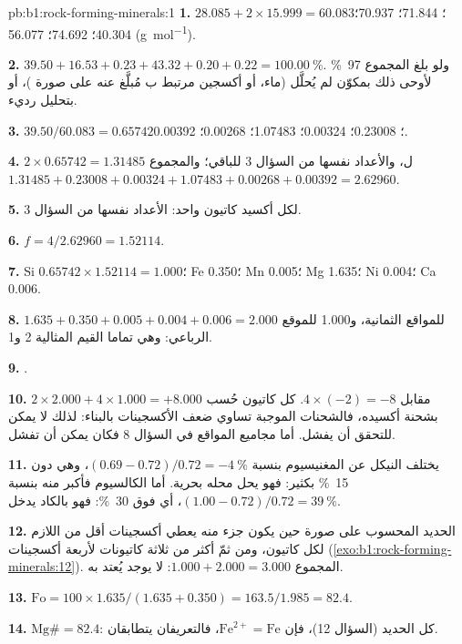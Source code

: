 \begin{solution}{pb:b1:rock-forming-minerals:1}
\textbf{1.}  $28.085 + 2\times15.999 = 60.083$؛  71.844؛
 70.937؛  40.304؛  74.692؛  56.077
(\si{g.mol^{-1}}).

\textbf{2.} $39.50 + 16.53 + 0.23 + 43.32 + 0.20 + 0.22 =
\qty{100.00}{\percent}$. ولو بلغ المجموع \qty{97}{\percent} لأوحى ذلك بمكوّن لم يُحلَّل (ماء، أو أكسجين مرتبط ب مُبلَّغ عنه على صورة )، أو بتحليل رديء.

\textbf{3.}  $39.50/60.083 = 0.65742$؛  0.23008؛ 
0.00324؛  1.07483؛  0.00268؛  0.00392.

\textbf{4.} $2\times0.65742 = 1.31485$ ل، والأعداد نفسها من السؤال 3 للباقي؛ والمجموع $1.31485 + 0.23008 + 0.00324 + 1.07483 +
0.00268 + 0.00392 = 2.62960$.

\textbf{5.} لكل أكسيد كاتيون واحد: الأعداد نفسها من السؤال 3.

\textbf{6.} $f = 4/2.62960 = 1.52114$.

\textbf{7.} Si $0.65742\times1.52114 = 1.000$؛ Fe 0.350؛ Mn 0.005؛ Mg 1.635؛
Ni 0.004؛ Ca 0.006.

\textbf{8.} $1.635 + 0.350 + 0.005 + 0.004 + 0.006 = 2.000$ للمواقع الثمانية، و\num{1.000} للموقع الرباعي: وهي تماما القيم المثالية 2 و\num{1}.

\textbf{9.} .

\textbf{10.} $2\times2.000 + 4\times1.000 = +8.000$ مقابل $4\times(-2) =
-8$. كل كاتيون حُسب بشحنة أكسيده، فالشحنات الموجبة تساوي ضعف الأكسجينات بالبناء: لذلك لا يمكن للتحقق أن يفشل. أما مجاميع المواقع في السؤال 8 فكان يمكن أن تفشل.

\textbf{11.} يختلف النيكل عن المغنيسيوم بنسبة $(0.69 - 0.72)/0.72 = -\qty{4}{\percent}$، وهي دون \qty{15}{\percent} بكثير: فهو يحل محله بحرية. أما الكالسيوم فأكبر منه بنسبة $(1.00 - 0.72)/0.72 = \qty{39}{\percent}$، أي فوق \qty{30}{\percent}: فهو بالكاد يدخل.

\textbf{12.} الحديد المحسوب على صورة  حين يكون جزء منه  يعطي أكسجينات أقل من اللازم لكل كاتيون، ومن ثمّ أكثر من ثلاثة كاتيونات لأربعة أكسجينات (\cref{exo:b1:rock-forming-minerals:12}). المجموع $1.000 + 2.000 = 3.000$: لا يوجد  يُعتد به.

\textbf{13.} $\mathrm{Fo} = 100\times1.635/(1.635 + 0.350) = 163.5/1.985 =
82.4$.

\textbf{14.} $\mathrm{Mg\#} = 82.4$: كل الحديد  (السؤال 12)، فإن $\mathrm{Fe^{2+}} = \mathrm{Fe}$، فالتعريفان يتطابقان.


\end{solution}
